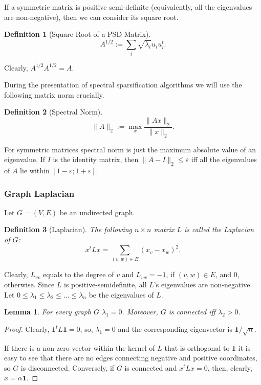 \documentclass[12pt]{article}
\newcommand{\eps}{\varepsilon}
\newtheorem{lemma}{Lemma}
\newtheorem{definition}{Definition}
\begin{document}
    If a symmetric matrix is positive semi-definite (equivalently, all the eigenvalues
    are non-negative), then we can consider its square root.

    \begin{definition}[Square Root of a PSD Matrix]
        $$
            A^{1/2} := \sum_{i} \sqrt{\lambda_i} u_i u_i^t.
        $$
    \end{definition}
    Clearly, $A^{1/2} A^{1/2} = A$.

    During the presentation of spectral sparsification algorithms we will use the following
    matrix norm crucially.

    \begin{definition}[Spectral Norm]
        $$
            \|A\|_2 := \max_{x} \frac{\|Ax\|_2}{\|x\|_2}.
        $$
    \end{definition}

    For symmetric matrices spectral norm is just the maximum absolute value of an eigenvalue.
    If $I$ is the identity matrix, then $\|A - I\|_2 \leq \eps$ iff all the eigenvalues of
    $A$ lie within $[1 - \eps; 1 + \eps]$.

    \subsubsection{Graph Laplacian}

    Let $G = (V, E)$ be an undirected graph.

    \begin{definition}[Laplacian]
        The following $n \times n$ matrix $L$ is called the Laplacian of $G$:
        $$
            x^t L x = \sum_{(v,w) \in E} (x_v - x_w)^2. 
        $$
    \end{definition}

    Clearly, $L_{vv}$ equals to the degree of $v$ and $L_{vw} = -1$, if $(v, w) \in E$,
    and $0$, otherwise.
    Since $L$ is positive-semidefinite, all $L$'s eigenvalues are non-negative. Let
    $0 \leq \lambda_1 \leq \lambda_2 \leq \ldots \leq \lambda_n$ be the eigenvalues of $L$.

    \begin{lemma}
        For every graph $G$ $\lambda_1 = 0$. Moreover, $G$ is connected iff $\lambda_2 > 0$.
    \end{lemma}
    \begin{proof}
        Clearly, $\mathbf{1}^t L \mathbf{1} = 0$, so, $\lambda_1 = 0$ and the corresponding
        eigenvector is $\mathbf{1} / \sqrt{n}$.

        If there is a non-zero
        vector within the kernel of $L$ that is orthogonal to $\mathbf{1}$
        it is easy to see that there are no edges connecting negative and positive
        coordinates, so $G$ is disconnected. Conversely, if $G$ is connected and
        $x^t L x = 0$, then, clearly, $x = \alpha \mathbf{1}$.
    \end{proof}
\end{document}
